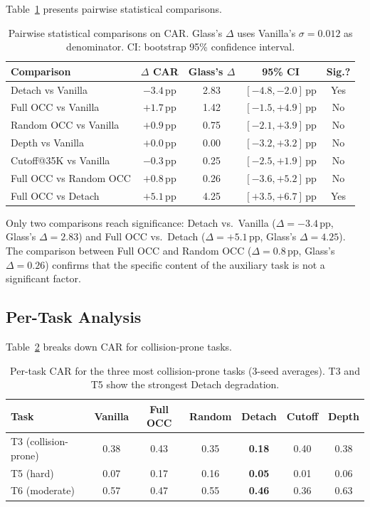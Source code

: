 \documentclass[letterpaper]{article}
\newcommand{\pp}{\,\textrm{pp}}
\begin{document}
Table~\ref{tab:stats} presents pairwise statistical comparisons.

\begin{table}[h]
\centering
\caption{Pairwise statistical comparisons on CAR. Glass's $\Delta$ uses Vanilla's $\sigma=0.012$ as denominator. CI: bootstrap 95\% confidence interval.}
\label{tab:stats}
\small
\begin{tabular}{lcccc}
\toprule
\textbf{Comparison} & \textbf{$\Delta$ CAR} & \textbf{Glass's $\Delta$} & \textbf{95\% CI} & \textbf{Sig.?} \\
\midrule
Detach vs Vanilla       & $-3.4\pp$ & 2.83 & $[-4.8, -2.0]\pp$ & Yes \\
Full OCC vs Vanilla     & $+1.7\pp$ & 1.42 & $[-1.5, +4.9]\pp$ & No \\
Random OCC vs Vanilla   & $+0.9\pp$ & 0.75 & $[-2.1, +3.9]\pp$ & No \\
Depth vs Vanilla        & $+0.0\pp$ & 0.00 & $[-3.2, +3.2]\pp$ & No \\
Cutoff@35K vs Vanilla   & $-0.3\pp$ & 0.25 & $[-2.5, +1.9]\pp$ & No \\
Full OCC vs Random OCC  & $+0.8\pp$ & 0.26 & $[-3.6, +5.2]\pp$ & No \\
Full OCC vs Detach      & $+5.1\pp$ & 4.25 & $[+3.5, +6.7]\pp$ & Yes \\
\bottomrule
\end{tabular}
\end{table}

Only two comparisons reach significance: Detach vs.\ Vanilla ($\Delta=-3.4\pp$, Glass's $\Delta=2.83$) and Full OCC vs.\ Detach ($\Delta=+5.1\pp$, Glass's $\Delta=4.25$).
The comparison between Full OCC and Random OCC ($\Delta=0.8\pp$, Glass's $\Delta=0.26$) confirms that the specific content of the auxiliary task is not a significant factor.

\subsection{Per-Task Analysis}
\label{sec:pertask}

Table~\ref{tab:pertask} breaks down CAR for collision-prone tasks.

\begin{table}[h]
\centering
\caption{Per-task CAR for the three most collision-prone tasks (3-seed averages). T3 and T5 show the strongest Detach degradation.}
\label{tab:pertask}
\small
\begin{tabular}{lcccccc}
\toprule
\textbf{Task} & \textbf{Vanilla} & \textbf{Full OCC} & \textbf{Random} & \textbf{Detach} & \textbf{Cutoff} & \textbf{Depth} \\
\midrule
T3 (collision-prone) & 0.38 & 0.43 & 0.35 & \textbf{0.18} & 0.40 & 0.38 \\
T5 (hard)            & 0.07 & 0.17 & 0.16 & \textbf{0.05} & 0.01 & 0.06 \\
T6 (moderate)        & 0.57 & 0.47 & 0.55 & \textbf{0.46} & 0.36 & 0.63 \\
\bottomrule
\end{tabular}
\end{table}
\end{document}
